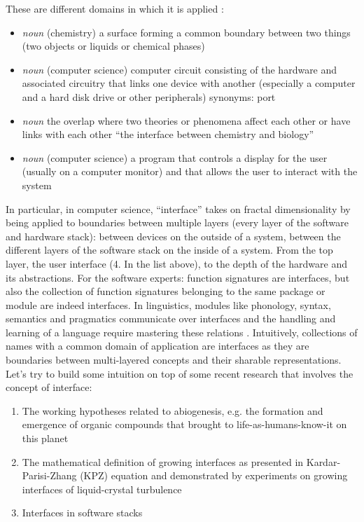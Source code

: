 \documentclass[14pt]{extarticle}
\begin{document}
These are different domains in which it is applied \cite{VocabInterface}:
\begin{itemize}
\item \textit{noun} (chemistry) a surface forming a common boundary between two things (two objects or liquids or chemical phases)
\item \textit{noun}  (computer science) computer circuit consisting of the hardware and associated circuitry that links one device with another (especially a computer and a hard disk drive or other peripherals) synonyms: port            
\item \textit{noun}  the overlap where two theories or phenomena affect each other or have links with each other “the interface between chemistry and biology”        
\item \textit{noun}  (computer science) a program that controls a display for the user (usually on a computer monitor) and that allows the user to interact with the system
\end{itemize}
In particular, in computer science, “interface” takes on fractal dimensionality by being applied to boundaries between multiple layers (every layer of the software and hardware stack): between devices on the outside of a system, between the different layers of the software stack on the inside of a system. From the top layer, the user interface (4. In the list above), to the depth of the hardware and its abstractions.
\newline
For the software experts: function signatures are interfaces, but also the collection of function signatures belonging to the same package or module are indeed interfaces.
\newline
\hspace*{15mm}In linguistics, modules like phonology, syntax, semantics and pragmatics communicate over interfaces and the handling and learning of a language require mastering these relations \cite{Lanthi2006}. Intuitively, collections of names with a common domain of application are interfaces as they are boundaries between multi-layered concepts and their sharable representations.
\newline
\hspace*{15mm}Let’s try to build some intuition on top of some recent research that involves the concept of interface:

\begin{enumerate}
\item The working hypotheses related to abiogenesis, e.g. the formation and emergence of organic compounds that brought to life-as-humans-know-it on this planet \cite{lingam2021life}
\item The mathematical definition of growing interfaces as presented in Kardar-Parisi-Zhang (KPZ) equation and demonstrated by experiments on growing interfaces of liquid-crystal turbulence \cite{PhysRevLett.56.889,Takeuchi2011}
\item Interfaces in software stacks
\end{enumerate}
\end{document}
